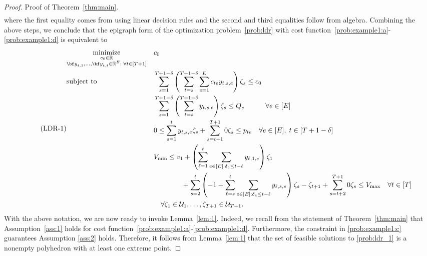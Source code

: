\documentclass[nonblindrev,mnsc]{informs3} %
\newcommand{\by}{{\bf y}}
\def\Real{\mathbb{R}}
\let\R\Real
\begin{document}
\begin{APPENDICES}
\begin{proof}{Proof of Theorem~\ref{thm:main}. }
\begin{align*}
\end{align*}
where the first equality comes from using linear decision rules and the second and third equalities follow from algebra. Combining the above steps, we  conclude that the epigraph form of the optimization problem~\eqref{prob:ldr} with cost function~\eqref{prob:example1:a}-\eqref{prob:example1:d} is equivalent to 
\begin{equation} \label{prob:ldr_1} \tag{\textnormal{LDR-1}}
    \begin{aligned}
   & \underset{\substack{c_0 \in \R \\\by_{t,1},\ldots,\by_{t,t} \in \R^E:\;  \forall t \in [T+1]}}{\textnormal{minimize}}&&c_0\\ 
    &\textnormal{subject to}&& \sum_{s=1}^{T +1-\delta}  \left( \sum_{t=s}^{T+1-\delta} \sum_{e=1}^E c_{te} y_{t,s,e} \right)  \zeta_s \le c_0 \\
    &&&\sum_{s=1}^{T+1-\delta} \left( \sum_{t=s}^{T+1-\delta} y_{t,s,e} \right) \zeta_s \le  Q_e \quad \quad \quad   \forall e \in[E] \\
   &&& 0 \le  \sum_{s=1}^{t}  y_{t,s,e} \zeta_s + \sum_{s=t+1}^{T+1} 0 \zeta_s \le  p_{te} \quad \forall  e\in[E],\; t \in [T+1-\delta]\\
   &&&V_{\textnormal{min}} \le  v_1 + \left( \sum_{\ell=1}^t \sum_{e \in [E]: \delta_e \le t - \ell} y_{\ell,1,e} \right) \zeta_1 \\
   &&& \quad \quad \quad \quad + \sum_{s=2}^t \left(-1 + \sum_{\ell=s}^t \sum_{e \in [E]: \delta_e \le t - \ell} y_{\ell,s,e} \right) \zeta_s - \zeta_{t+1} + \sum_{s=t+2}^{T+1} 0 \zeta_s  \le  V_{\textnormal{max}}\quad  \forall  t \in [T]\\
   &&& \quad \forall \zeta_1 \in \mathcal{U}_1,\ldots,\zeta_{T+1} \in \mathcal{U}_{T+1}.
    \end{aligned}
  \end{equation} 
With the above notation, we are now ready to invoke Lemma~\ref{lem:1}. Indeed, we recall from the statement of Theorem~\ref{thm:main} that Assumption~\ref{ass:1} holds for cost function~\eqref{prob:example1:a}-\eqref{prob:example1:d}. {Furthermore, the constraint in \eqref{prob:example1:c} guarantees Assumption \ref{ass:2} holds.} Therefore, it follows from Lemma~\ref{lem:1} that the set of feasible solutions to \eqref{prob:ldr_1} is a nonempty polyhedron with at least one extreme point.  


\end{proof}
\end{APPENDICES}
\end{document}
